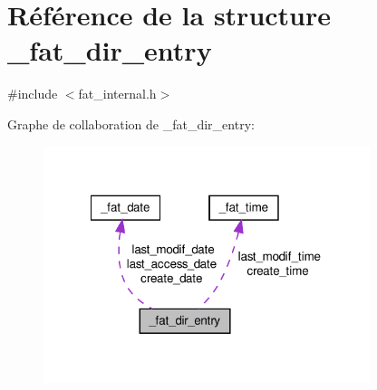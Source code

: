 \hypertarget{struct__fat__dir__entry}{\section{Référence de la structure \+\_\+fat\+\_\+dir\+\_\+entry}
\label{struct__fat__dir__entry}
}


{\ttfamily \#include $<$fat\+\_\+internal.\+h$>$}



Graphe de collaboration de \+\_\+fat\+\_\+dir\+\_\+entry\+:\nopagebreak
\begin{figure}[H]
\begin{center}
\leavevmode
\includegraphics[width=270pt]{struct__fat__dir__entry__coll__graph}
\end{center}
\end{figure}
